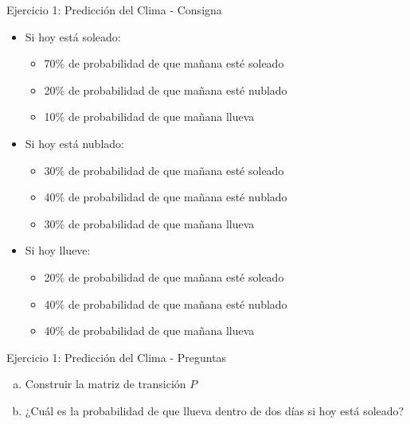 \documentclass{beamer}
\begin{document}
\begin{frame}{Ejercicio 1: Predicción del Clima - Consigna}
    \begin{itemize}
        \item Si hoy está soleado:
            \begin{itemize}
                \item 70\% de probabilidad de que mañana esté soleado
                \item 20\% de probabilidad de que mañana esté nublado
                \item 10\% de probabilidad de que mañana llueva
            \end{itemize}
        \item Si hoy está nublado:
            \begin{itemize}
                \item 30\% de probabilidad de que mañana esté soleado
                \item 40\% de probabilidad de que mañana esté nublado
                \item 30\% de probabilidad de que mañana llueva
            \end{itemize}
        \item Si hoy llueve:
            \begin{itemize}
                \item 20\% de probabilidad de que mañana esté soleado
                \item 40\% de probabilidad de que mañana esté nublado
                \item 40\% de probabilidad de que mañana llueva
            \end{itemize}
    \end{itemize}
\end{frame}

\begin{frame}{Ejercicio 1: Predicción del Clima - Preguntas}
    \begin{enumerate}[a)]
        \item Construir la matriz de transición $P$
        \item ¿Cuál es la probabilidad de que llueva dentro de dos días si hoy está soleado?
    \end{enumerate}
\end{frame}
\end{document}
